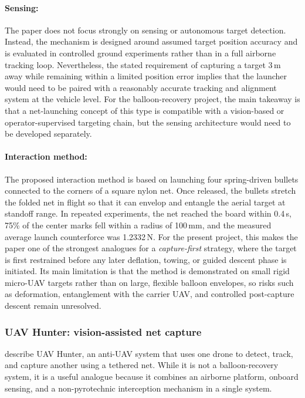 \paragraph{Sensing:} The paper does not focus strongly on sensing or autonomous target detection. Instead, the mechanism is designed around assumed target position accuracy and is evaluated in controlled ground experiments rather than in a full airborne tracking loop. Nevertheless, the stated requirement of capturing a target 3\,m away while remaining within a limited position error implies that the launcher would need to be paired with a reasonably accurate tracking and alignment system at the vehicle level. For the balloon-recovery project, the main takeaway is that a net-launching concept of this type is compatible with a vision-based or operator-supervised targeting chain, but the sensing architecture would need to be developed separately. \cite{Meng2018NetLaunching}

\paragraph{Interaction method:} The proposed interaction method is based on launching four spring-driven bullets connected to the corners of a square nylon net. Once released, the bullets stretch the folded net in flight so that it can envelop and entangle the aerial target at standoff range. In repeated experiments, the net reached the board within 0.4\,s, 75\% of the center marks fell within a radius of 100\,mm, and the measured average launch counterforce was 1.2332\,N. For the present project, this makes the paper one of the strongest analogues for a \emph{capture-first} strategy, where the target is first restrained before any later deflation, towing, or guided descent phase is initiated. Its main limitation is that the method is demonstrated on small rigid micro-UAV targets rather than on large, flexible balloon envelopes, so risks such as deformation, entanglement with the carrier UAV, and controlled post-capture descent remain unresolved. \cite{Meng2018NetLaunching}





\subsubsection{UAV Hunter: vision-assisted net capture}
\cite{Zhang2024UAVDefense} describe UAV Hunter, an anti-UAV system that uses one drone to detect, track, and capture another using a tethered net. While it is not a balloon-recovery system, it is a useful analogue because it combines an airborne platform, onboard sensing, and a non-pyrotechnic interception mechanism in a single system.

